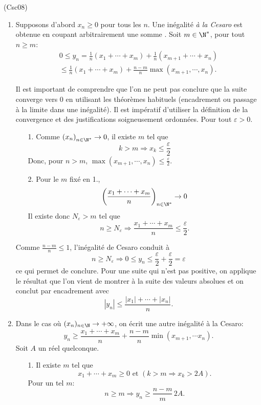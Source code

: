 \begin{tiny}(Csc08)\end{tiny}
\begin{enumerate}
 \item Supposons d'abord $x_n \geq0$ pour tous les $n$.\newline
 Une inégalité \emph{à la Cesaro} est obtenue en coupant arbitrairement une somme .\newline
 Soit $m \in \N^*$, pour tout $n\geq m$:
\begin{multline*}
 0 \leq y_n = \frac{1}{n}(x_1 + \cdots +x_m) + \frac{1}{n}(x_{m+1} + \cdots + x_n) \\
 \leq \frac{1}{n}(x_1 + \cdots +x_m) + \frac{n-m}{n}\max(x_{m+1}, \cdots, x_n).
\end{multline*}

Il est important de comprendre que l'on ne peut pas conclure que la suite converge vers 0 en utilisant les théorèmes habituels (encadrement ou passage à la limite dans une inégalité). Il est impératif d'utiliser la définition de la convergence et des justifications soigneusement ordonnées.\newline
Pour tout $\varepsilon >0$.
\begin{itemize}
 \item [1.] Comme $\left( x_n \right)_{n \in \N^*} \rightarrow 0$, il existe $m$ tel que 
 \[
  k > m \Rightarrow x_k \leq \frac{\varepsilon}{2}
 \]
Donc, pour $n >m$, $\max(x_{m+1}, \cdots, x_n)\leq \frac{\varepsilon}{2}$.
 \item [2.] Pour le $m$ fixé en 1.,  
\[
 \left( \frac{x_1 + \cdots + x_m}{n} \right)_{n \in \N^*} \rightarrow 0
\]
Il existe donc $N_\varepsilon > m$ tel que
\[
 n \geq N_\varepsilon \Rightarrow
 \frac{x_1 + \cdots + x_m}{n} \leq \frac{\varepsilon}{2}.
\]
\end{itemize}
Comme $\frac{n-m}{n}\leq 1$, l'inégalité de Cesaro conduit à 
\[
 n \geq N_{\varepsilon} \Rightarrow 0 \leq y_n \leq \frac{\varepsilon}{2} + \frac{\varepsilon}{2} = \varepsilon
\]
ce qui permet de conclure.\newline
Pour une suite qui n'est pas positive, on applique le résultat que l'on vient de montrer à la suite des valeurs absolues et on conclut par encadrement avec
\[
 |y_n| \leq \frac{|x_1| + \cdots + |x_n|}{n}.
\]

 \item Dans le cas où $(x_n)_{n\in \N} \rightarrow + \infty$, on écrit une autre inégalité à la Cesaro:
\[
 y_n \geq \frac{x_1 + \cdots + x_m}{n} + \frac{n-m}{n}\min(x_{m+1}, \cdots x_n).
\]
Soit $A$ un réel quelconque.
\begin{itemize}
 \item [1.] Il existe $m$ tel que 
\[
  x_1 + \cdots + x_m \geq 0 \text{ et }  \left(k >m \Rightarrow x_k > 2A\right).
\]
Pour un tel $m$:
\[
  n \geq m \Rightarrow y_n \geq \frac{n-m}{m}\,2A.
\]


\end{itemize}
\end{enumerate}
